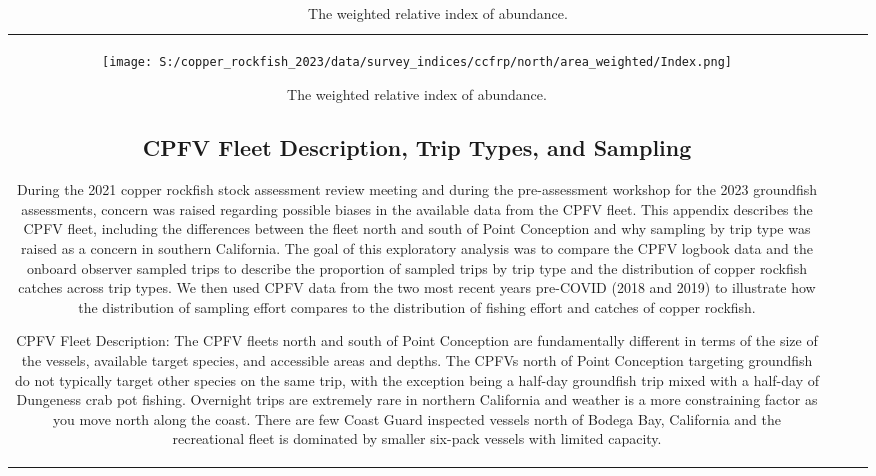 \documentclass[11pt,
  letterpaper,
]{article}
\begin{document}
\begin{longtable}[t]{c>{\centering\arraybackslash}p{2cm}>{\centering\arraybackslash}p{2cm}>{\centering\arraybackslash}p{2cm}}
\newpage

\begin{figure}
{\centering
\texttt{[image: S:/copper\_rockfish\_2023/data/survey\_indices/ccfrp/north/area\_weighted/Index.png]}
}
\caption{The weighted relative index of abundance.\label{fig:ccfrp-index}}
\end{figure}

\subsection{CPFV Fleet Description, Trip Types, and Sampling}\label{cpfv-samples}

During the 2021 copper rockfish stock assessment review meeting and during the pre-assessment workshop for the 2023 groundfish assessments, concern was raised regarding possible biases in the available data from the CPFV fleet. This appendix describes the CPFV fleet, including the differences between the fleet north and south of Point Conception and why sampling by trip type was raised as a concern in southern California. The goal of this exploratory analysis was to compare the CPFV logbook data and the onboard observer sampled trips to describe the proportion of sampled trips by trip type and the distribution of copper rockfish catches across trip types. We then used CPFV data from the two most recent years pre-COVID (2018 and 2019) to illustrate how the distribution of sampling effort compares to the distribution of fishing effort and catches of copper rockfish.

CPFV Fleet Description: The CPFV fleets north and south of Point Conception are fundamentally different in terms of the size of the vessels, available target species, and accessible areas and depths. The CPFVs north of Point Conception targeting groundfish do not typically target other species on the same trip, with the exception being a half-day groundfish trip mixed with a half-day of Dungeness crab pot fishing. Overnight trips are extremely rare in northern California and weather is a more constraining factor as you move north along the coast. There are few Coast Guard inspected vessels north of Bodega Bay, California and the recreational fleet is dominated by smaller six-pack vessels with limited capacity.


\end{longtable}
\end{document}
